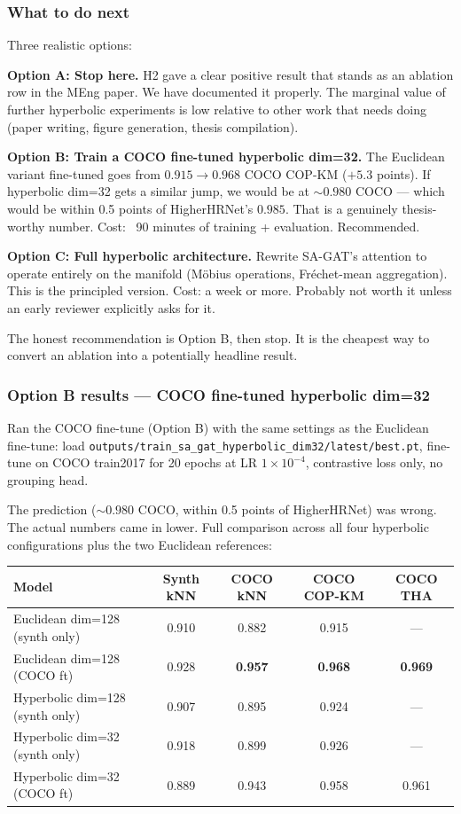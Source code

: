 \subsubsection{What to do next}

Three realistic options:

\textbf{Option A: Stop here.} H2 gave a clear positive result that stands as an ablation row in the MEng paper. We have documented it properly. The marginal value of further hyperbolic experiments is low relative to other work that needs doing (paper writing, figure generation, thesis compilation).

\textbf{Option B: Train a COCO fine-tuned hyperbolic dim=32.} The Euclidean variant fine-tuned goes from $0.915 \to 0.968$ COCO COP-KM ($+5.3$ points). If hyperbolic dim=32 gets a similar jump, we would be at $\sim 0.980$ COCO --- which would be within 0.5 points of HigherHRNet's $0.985$. That is a genuinely thesis-worthy number. Cost: ~90 minutes of training + evaluation. Recommended.

\textbf{Option C: Full hyperbolic architecture.} Rewrite SA-GAT's attention to operate entirely on the manifold (M\"obius operations, Fr\'echet-mean aggregation). This is the principled version. Cost: a week or more. Probably not worth it unless an early reviewer explicitly asks for it.

The honest recommendation is Option B, then stop. It is the cheapest way to convert an ablation into a potentially headline result.

\subsubsection{Option B results --- COCO fine-tuned hyperbolic dim=32}

Ran the COCO fine-tune (Option B) with the same settings as the Euclidean fine-tune: load \texttt{outputs/train\_sa\_gat\_hyperbolic\_dim32/latest/best.pt}, fine-tune on COCO train2017 for 20 epochs at LR $1 \times 10^{-4}$, contrastive loss only, no grouping head.

The prediction ($\sim 0.980$ COCO, within 0.5 points of HigherHRNet) was wrong. The actual numbers came in lower. Full comparison across all four hyperbolic configurations plus the two Euclidean references:

\begin{tabular}{lcccc}
\hline
\textbf{Model} & \textbf{Synth kNN} & \textbf{COCO kNN} & \textbf{COCO COP-KM} & \textbf{COCO THA} \\
\hline
Euclidean dim=128 (synth only) & 0.910 & 0.882 & 0.915 & --- \\
Euclidean dim=128 (COCO ft) & 0.928 & \textbf{0.957} & \textbf{0.968} & \textbf{0.969} \\
Hyperbolic dim=128 (synth only) & 0.907 & 0.895 & 0.924 & --- \\
Hyperbolic dim=32 (synth only) & 0.918 & 0.899 & 0.926 & --- \\
Hyperbolic dim=32 (COCO ft) & 0.889 & 0.943 & 0.958 & 0.961 \\
\hline
\end{tabular}

